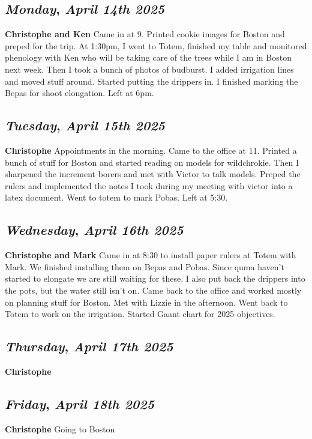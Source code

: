 \def\day{\textit{April 14th 2025}}
\def\weekday{\textit{Monday}}
\subsection*{\weekday, \day}
\textbf {Christophe and Ken}
Came in at 9. Printed cookie images for Boston and preped for the trip. At 1:30pm, I went to Totem, finished my table and monitored phenology with Ken who will be taking care of the trees while I am in Boston next week. Then I took a bunch of photos of budburst. I added irrigation lines and moved stuff around. Started putting the drippers in. I finished marking the Bepas for shoot elongation. Left at 6pm. 

\def\day{\textit{April 15th 2025}}
\def\weekday{\textit{Tuesday}}
\subsection*{\weekday, \day}
\textbf {Christophe}
Appointments in the morning. Came to the office at 11. Printed a bunch of stuff for Boston and started reading on models for wildchrokie. Then I sharpened the increment borers and met with Victor to talk models. Preped the rulers and implemented the notes I took during my meeting with victor into a latex document. Went to totem to mark Pobas. Left at 5:30.

\def\day{\textit{April 16th 2025}}
\def\weekday{\textit{Wednesday}}
\subsection*{\weekday, \day}
\textbf {Christophe and Mark}
Came in at 8:30 to install paper rulers at Totem with Mark.	We finished installing them on Bepas and Pobas. Since quma haven't started to elongate we are still waiting for these. I also put back the drippers into the pots, but the water still isn't on. Came back to the office and worked mostly on planning stuff for Boston. Met with Lizzie in the afternoon. Went back to Totem to work on the irrigation. Started Gaant chart for 2025 objectives. 
\def\day{\textit{April 17th 2025}}
\def\weekday{\textit{Thursday}}
\subsection*{\weekday, \day}
\textbf {Christophe}

\def\day{\textit{April 18th 2025}}
\def\weekday{\textit{Friday}}
\subsection*{\weekday, \day}
\textbf {Christophe}
Going to Boston


